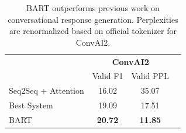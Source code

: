 \documentclass{article} %
\begin{document}
\begin{table}[t]
\centering
\begin{tabular}{lccc}
\toprule
                     & \multicolumn{2}{c}{\textbf{ConvAI2}} & %
                     \\
                     & Valid F1           & Valid PPL         \\%
\midrule
Seq2Seq + Attention	&   16.02            &       35.07 \\             
Best System         &   19.09            &       17.51        \\%
BART                 &  \textbf{20.72}            &     \textbf{11.85}           &         \\%
\bottomrule
\end{tabular}
\caption{BART outperforms previous work on conversational response generation. Perplexities are renormalized based on official tokenizer for ConvAI2. 
}
\end{table}
\end{document}

